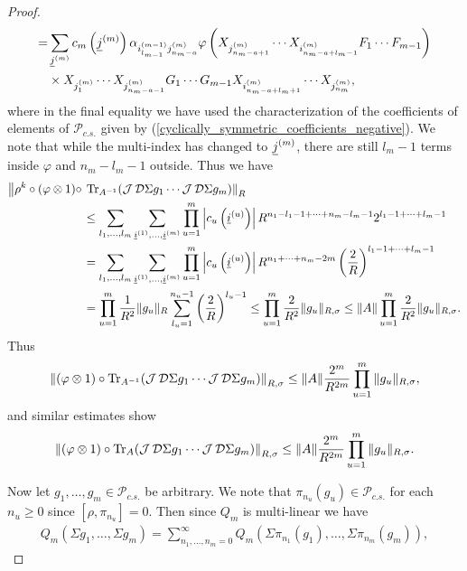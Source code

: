 \begin{proof}
\begin{align*}
		=&\sum_{\underline{j}^{(m)}} c_m\left( \underline{j}^{(m)}\right) \alpha_{i_{l_{m-1}}^{(m-1)} j_{n_m-a}^{(m)}}\varphi\left( X_{j_{n_m-a+1}^{(m)}}\cdots X_{i_{n_m-a+l_m-1}^{(m)}} F_1\cdots F_{m-1}\right)\\
			&\times  X_{j_1^{(m)}} \cdots X_{j_{n_m-a-1}^{(m)}} G_1\cdots G_{m-1} X_{i_{n_m-a+l_m+1}^{(m)}} \cdots X_{j_{n_m}^{(m)}},
	\end{align*}
where in the final equality we have used the characterization of the coefficients of elements of $\mathscr{P}_{c.s.}$ given by (\ref{cyclically_symmetric_coefficients_negative}). We note that while the multi-index has changed to $\underline{j}^{(m)}$, there are still $l_m-1$ terms inside $\varphi$ and $n_m-l_m-1$ outside. Thus we have
	\begin{align*}
		\left\| \rho^k\circ(\varphi\otimes 1)\circ\right.&\left.\text{Tr}_{A^{-1}}(\operatorname{\mathcal J}\mathcal D\Sigma g_1\cdots \operatorname{\mathcal J}\mathcal D\Sigma g_m)\right\|_R \\
				&\leq \sum_{l_1,\ldots,l_m} \sum_{\underline{i}^{(1)},\ldots, \underline{i}^{(m)}} \prod_{u=1}^m \left| c_u\left(\underline{i}^{(u)}\right)\right| R^{n_1-l_1-1+\cdots +n_m-l_m-1}2^{l_1-1+\cdots +l_m-1}\\
				&=\sum_{l_1,\ldots,l_m} \sum_{\underline{i}^{(1)},\ldots, \underline{i}^{(m)}} \prod_{u=1}^m \left| c_u\left(\underline{i}^{(u)}\right)\right| R^{n_1+\cdots +n_m - 2m}\left(\frac{2}{R}\right)^{l_1-1+\cdots +l_m-1}\\
				&=\prod_{u=1}^m \frac{1}{R^2} \|g_u\|_{R} \sum_{l_u=1}^{n_u-1} \left(\frac{2}{R}\right)^{l_u-1}\leq \prod_{u=1}^m \frac{2}{R^2} \|g_u\|_{R,\sigma}\leq \|A\| \prod_{u=1}^m \frac{2}{R^2} \|g_u\|_{R,\sigma}.
	\end{align*}
Thus	
	\begin{align*}
		\left\| (\varphi\otimes 1)\circ\text{Tr}_{A^{-1}}(\operatorname{\mathcal J}\mathcal D\Sigma g_1\cdots \operatorname{\mathcal J}\mathcal D\Sigma g_m)\right\|_{R,\sigma}\leq \|A\| \frac{2^m}{R^{2m}}\prod_{u=1}^m \|g_u\|_{R,\sigma},
	\end{align*}
and similar estimates show
	\begin{align*}
		\left\| (\varphi\otimes 1)\circ\text{Tr}_{A}(\operatorname{\mathcal J}\mathcal D\Sigma g_1\cdots \operatorname{\mathcal J}\mathcal D\Sigma g_m)\right\|_{R,\sigma}\leq \|A\| \frac{2^m}{R^{2m}}\prod_{u=1}^m \|g_u\|_{R,\sigma}.
	\end{align*}\par
Now let $g_1,\ldots, g_m\in \mathscr{P}_{c.s.}$ be arbitrary. We note that $\pi_{n_u}(g_u)\in\mathscr{P}_{c.s.}$ for each $n_u\geq 0$ since $[\rho,\pi_{n_u}]=0$. Then since $Q_m$ is multi-linear we have
	\begin{align*}
		Q_m(\Sigma g_1,\ldots,\Sigma g_m)= \sum_{n_1,\ldots, n_m=0}^\infty Q_m\left(\Sigma \pi_{n_1}(g_1),\ldots, \Sigma \pi_{n_m}(g_m)\right),

\end{align*}
\end{proof}
